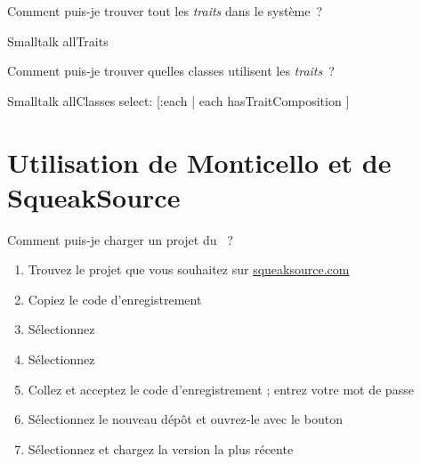 \documentclass[a4paper,10pt,twoside]{book}
\begin{document}
\begin{faq}
Comment puis-je trouver tout les \emph{traits} dans le syst\`eme~?
\end{faq}
\answer
\begin{code}{}
Smalltalk allTraits
\end{code}

\begin{faq}
Comment puis-je trouver quelles classes utilisent les \emph{traits}~?
\end{faq}
\answer
\begin{code}{}
Smalltalk allClasses select: [:each | each hasTraitComposition ]
\end{code}

\section{Utilisation de Monticello et de SqueakSource}

\begin{faq}
Comment puis-je charger un projet du ~?
\end{faq}
\answer
\begin{enumerate}
  \item Trouvez le projet que vous souhaitez sur \url{squeaksource.com}
  \item Copiez le code d'enregistrement
  \item S\'electionnez 
  \item S\'electionnez 
  \item Collez et acceptez le code d'enregistrement ; entrez votre mot de passe
  \item S\'electionnez le nouveau d\'ep\^ot et ouvrez-le avec le bouton 
  \item S\'electionnez et chargez la version la plus r\'ecente
\end{enumerate}
\end{document}
